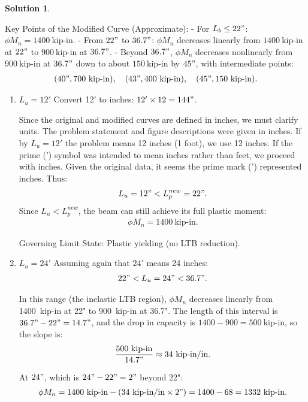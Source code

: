\documentclass[12pt]{article}
\theoremstyle{definition} %
\newtheorem{solution}{Solution}
\theoremstyle{plain} %
\begin{document}
\begin{solution}
\begin{enumerate}
Key Points of the Modified Curve (Approximate):
- For $L_b \leq 22"$: $\phi M_n = 1400~\text{kip-in}$.
- From $22"$ to $36.7"$: $\phi M_n$ decreases linearly from $1400~\text{kip-in}$ at $22"$ to $900~\text{kip-in}$ at $36.7"$.
- Beyond $36.7"$, $\phi M_n$ decreases nonlinearly from $900~\text{kip-in}$ at $36.7"$ down to about $150~\text{kip-in}$ by $45"$, with intermediate points:
  \begin{align}
  (40",700~\text{kip-in}), \quad (43",400~\text{kip-in}), \quad (45",150~\text{kip-in}).
  \end{align}
\begin{enumerate}
    \item $L_u = 12'$
Convert 12' to inches: $12' \times 12 = 144"$.

Since the original and modified curves are defined in inches, we must clarify units. The problem statement and figure descriptions were given in inches. If by $L_u = 12'$ the problem means 12 inches (1 foot), we use 12 inches. If the prime (') symbol was intended to mean inches rather than feet, we proceed with inches. Given the original data, it seems the prime mark (') represented inches. Thus:
\begin{align}
L_u = 12" < L_p^{new} = 22".
\end{align}
Since $L_u < L_p^{new}$, the beam can still achieve its full plastic moment:
\begin{align}
\phi M_n = 1400~\text{kip-in}.
\end{align}

Governing Limit State: Plastic yielding (no LTB reduction).

\item $L_u = 24'$
Assuming again that $24'$ means 24 inches:
\begin{align}
22" < L_u = 24" < 36.7".
\end{align}

In this range (the inelastic LTB region), $\phi M_n$ decreases linearly from 1400~kip-in at 22" to 900~kip-in at 36.7". The length of this interval is $36.7" - 22" = 14.7"$, and the drop in capacity is $1400 - 900 = 500~\text{kip-in}$, so the slope is:
\begin{align}
\frac{500~\text{kip-in}}{14.7"} \approx 34~\text{kip-in/in}.
\end{align}

At $24"$, which is $24" - 22" = 2"$ beyond 22":
\begin{align}
\phi M_n = 1400~\text{kip-in} - (34~\text{kip-in/in} \times 2") = 1400 - 68 = 1332~\text{kip-in}.
\end{align}


\end{enumerate}
\end{enumerate}
\end{solution}
\end{document}
